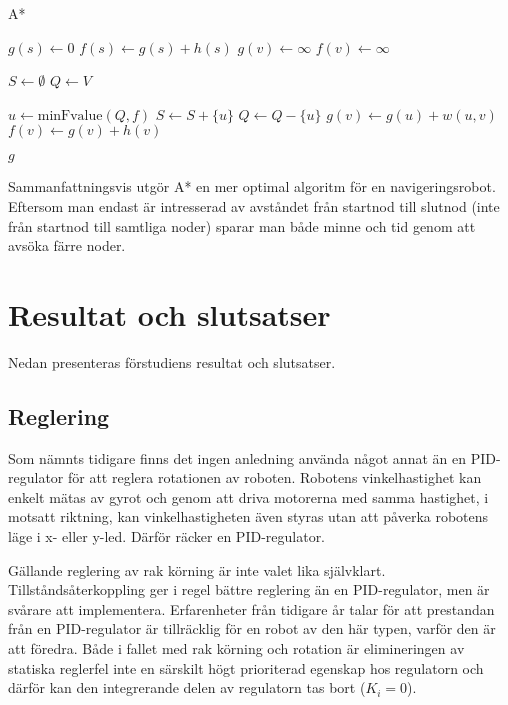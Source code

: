 \documentclass[11pt]{article}
\begin{document}
\begin{flushleft}
\begin{algorithm}[H]
	\caption{A*} \label{astar}
	\begin{algorithmic}[1]
			\State $g(s) \gets 0$
			\State $f(s) \gets g(s) + h(s)$
				\State $g(v) \gets \infty$
				\State $f(v) \gets \infty$
			\EndFor
			
			\State $S \gets \emptyset$
			\State $Q \gets V$
			
				\State $u \gets \textrm{minFvalue}(Q,f)$%
				\State $S \gets S +  \{ u\}$
				\State $Q \gets Q - \{ u\}$
						\State $g(v) \gets g(u) + w(u,v)$
						\State $f(v) \gets g(v) + h(v)$
					\EndIf
				\EndFor
			\EndWhile
			
			\Return $g$
		\EndFunction
	\end{algorithmic}
\end{algorithm}

Sammanfattningsvis utgör A* en mer optimal algoritm för en navigeringsrobot. Eftersom man endast är intresserad av avståndet från startnod till slutnod (inte från startnod till samtliga noder) sparar man både minne och tid genom att avsöka färre noder. 

\pagebreak
\section{Resultat och slutsatser}
Nedan presenteras förstudiens resultat och slutsatser.
\subsection{Reglering}
Som nämnts tidigare finns det ingen anledning använda något annat än en PID-regulator för att reglera rotationen av roboten. Robotens vinkelhastighet kan enkelt mätas av gyrot och genom att driva motorerna med samma hastighet, i motsatt riktning, kan vinkelhastigheten även styras utan att påverka robotens läge i x- eller y-led. Därför räcker en PID-regulator.

Gällande reglering av rak körning är inte valet lika självklart. Tillståndsåterkoppling ger i regel bättre reglering än en PID-regulator, men är svårare att implementera. Erfarenheter från tidigare år talar för att prestandan från en PID-regulator är tillräcklig för en robot av den här typen, varför den är att föredra. Både i fallet med rak körning och rotation är elimineringen av statiska reglerfel inte en särskilt högt prioriterad egenskap hos regulatorn och därför kan den integrerande delen av regulatorn tas bort ($K_i = 0$).


\end{flushleft}
\end{document}
